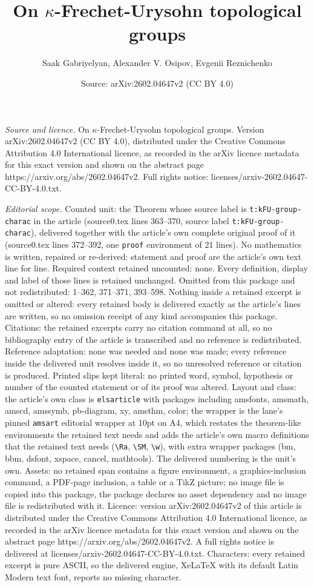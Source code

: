 \documentclass[10pt,a4paper]{amsart}
\title[On $\kappa$-Frechet-Urysohn topological groups]{On $\kappa$-Frechet-Urysohn topological groups}
\author{Saak Gabriyelyan, Alexander V. Osipov, Evgenii Reznichenko}
\date{Source: arXiv:2602.04647v2 (CC BY 4.0)}
\begin{document}
\maketitle

\noindent\emph{Source and licence.} On $\kappa$-Frechet-Urysohn topological groups. Version arXiv:2602.04647v2 (CC BY 4.0), distributed under the Creative Commons Attribution 4.0 International licence, as recorded in the arXiv licence metadata for this exact version and shown on the abstract page https://arxiv.org/abs/2602.04647v2. Full rights notice: licenses/arxiv-2602.04647-CC-BY-4.0.txt.\par\smallskip

\noindent\textit{Editorial scope.} Counted unit: the Theorem whose source label is \texttt{t:kFU-group-charac} in the article (source0.tex lines 363--370, source label \texttt{t:kFU-group-charac}), delivered together with the article's own complete original proof of it (source0.tex lines 372--392, one \texttt{proof} environment of 21 lines). No mathematics is written, repaired or re-derived: statement and proof are the article's own text line for line. Required context retained uncounted: none. Every definition, display and label of those lines is retained unchanged. Omitted from this package and not redistributed: 1--362, 371--371, 393--598. Nothing inside a retained excerpt is omitted or altered: every retained body is delivered exactly as the article's lines are written, so no omission receipt of any kind accompanies this package. Citations: the retained excerpts carry no citation command at all, so no bibliography entry of the article is transcribed and no reference is redistributed. Reference adaptation: none was needed and none was made; every reference inside the delivered unit resolves inside it, so no unresolved reference or citation is produced. Printed slips kept literal: no printed word, symbol, hypothesis or number of the counted statement or of its proof was altered. Layout and class: the article's own class is \texttt{elsarticle} with packages including amsfonts, amsmath, amscd, amssymb, pb-diagram, xy, amsthm, color; the wrapper is the lane's pinned \texttt{amsart} editorial wrapper at 10pt on A4, which restates the theorem-like environments the retained text needs and adds the article's own macro definitions that the retained text needs (\texttt{\textbackslash Ra}, \texttt{\textbackslash SM}, \texttt{\textbackslash w}), with extra wrapper packages (bm, bbm, dsfont, xspace, cancel, mathtools). The delivered numbering is the unit's own. Assets: no retained span contains a figure environment, a graphics-inclusion command, a PDF-page inclusion, a table or a TikZ picture; no image file is copied into this package, the package declares no asset dependency and no image file is redistributed with it. Licence: version arXiv:2602.04647v2 of this article is distributed under the Creative Commons Attribution 4.0 International licence, as recorded in the arXiv licence metadata for this exact version and shown on the abstract page https://arxiv.org/abs/2602.04647v2. A full rights notice is delivered at licenses/arxiv-2602.04647-CC-BY-4.0.txt. Characters: every retained excerpt is pure ASCII, so the delivered engine, XeLaTeX with its default Latin Modern text font, reports no missing character.
\end{document}
